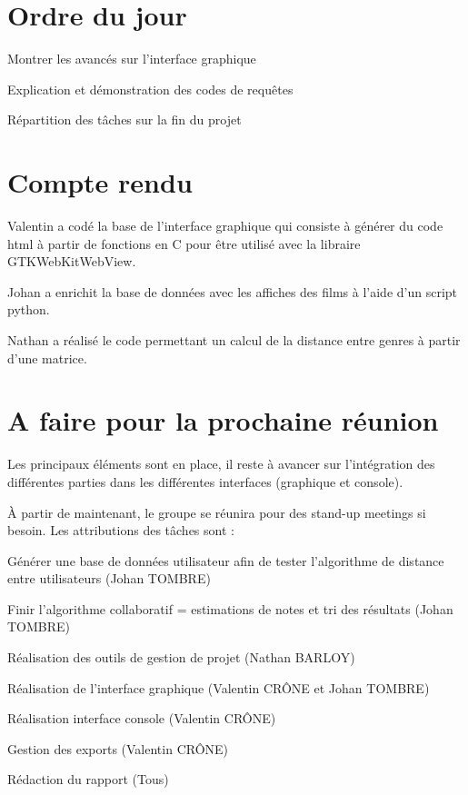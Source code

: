 \documentclass[11pt]{meetingmins}
\begin{document}
\maketitle

\section{Ordre du jour}
\begin{hiddenitems}
	\item Montrer les avancés sur l'interface graphique
	\item Explication et démonstration des codes de requêtes
	\item Répartition des tâches sur la fin du projet
\end{hiddenitems}
\section{Compte rendu}
Valentin a codé la base de l'interface graphique qui consiste à générer du code html à partir de fonctions en C pour être utilisé avec la libraire GTKWebKitWebView.\par
Johan a enrichit la base de données avec les affiches des films à l'aide d'un script python.\par
Nathan a réalisé le code permettant un calcul de la distance entre genres à partir d'une matrice.
\vspace{0.5cm}
\section{A faire pour la prochaine réunion}
Les principaux éléments sont en place, il reste à avancer sur l'intégration des différentes parties dans les différentes interfaces (graphique et console).\par
À partir de maintenant, le groupe se réunira pour des stand-up meetings si besoin.
Les attributions des tâches sont :
\begin{items}
	\item Générer une base de données utilisateur afin de tester l'algorithme de distance entre utilisateurs (Johan TOMBRE)
	\item Finir l'algorithme collaboratif = estimations de notes et tri des résultats (Johan TOMBRE)
	\item Réalisation des outils de gestion de projet (Nathan BARLOY)
	\item Réalisation de l'interface graphique (Valentin CRÔNE et Johan TOMBRE)
	\item Réalisation interface console (Valentin CRÔNE)
	\item Gestion des exports (Valentin CRÔNE)
	\item Rédaction du rapport (Tous)
\end{items}
\end{document}
